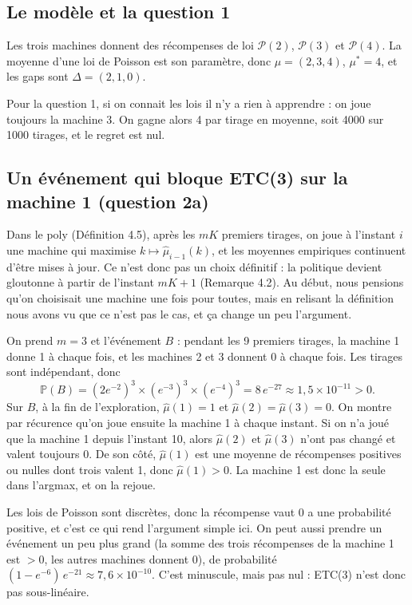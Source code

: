 \documentclass[11pt,a4paper]{article}
\begin{document}
\subsection{Le modèle et la question 1}

Les trois machines donnent des récompenses de loi $\mathcal P(2)$, $\mathcal P(3)$ et $\mathcal P(4)$. La moyenne d'une loi de Poisson est son paramètre, donc $\mu = (2, 3, 4)$, $\mu^* = 4$, et les gaps sont $\Delta = (2, 1, 0)$.

Pour la question 1, si on connait les lois il n'y a rien à apprendre : on joue toujours la machine 3. On gagne alors 4 par tirage en moyenne, soit 4000 sur 1000 tirages, et le regret est nul.

\subsection{Un événement qui bloque ETC(3) sur la machine 1 (question 2a)}

Dans le poly (Définition 4.5), après les $mK$ premiers tirages, on joue à l'instant $i$ une machine qui maximise $k \mapsto \hat\mu_{i-1}(k)$, et les moyennes empiriques continuent d'être mises à jour. Ce n'est donc pas un choix définitif : la politique devient gloutonne à partir de l'instant $mK+1$ (Remarque 4.2). Au début, nous pensions qu'on choisisait une machine une fois pour toutes, mais en relisant la définition nous avons vu que ce n'est pas le cas, et ça change un peu l'argument.

On prend $m = 3$ et l'événement $B$ : pendant les 9 premiers tirages, la machine 1 donne 1 à chaque fois, et les machines 2 et 3 donnent 0 à chaque fois. Les tirages sont indépendant, donc
\[
  \mathbb P(B) = (2e^{-2})^3 \times (e^{-3})^3 \times (e^{-4})^3 = 8\,e^{-27} \approx 1,5 \times 10^{-11} > 0.
\]
Sur $B$, à la fin de l'exploration, $\hat\mu(1) = 1$ et $\hat\mu(2) = \hat\mu(3) = 0$. On montre par récurence qu'on joue ensuite la machine 1 à chaque instant. Si on n'a joué que la machine 1 depuis l'instant 10, alors $\hat\mu(2)$ et $\hat\mu(3)$ n'ont pas changé et valent toujours 0. De son côté, $\hat\mu(1)$ est une moyenne de récompenses positives ou nulles dont trois valent 1, donc $\hat\mu(1) > 0$. La machine 1 est donc la seule dans l'argmax, et on la rejoue.

Les lois de Poisson sont discrètes, donc \og la récompense vaut 0\fg{} a une probabilité positive, et c'est ce qui rend l'argument simple ici. On peut aussi prendre un événement un peu plus grand (la somme des trois récompenses de la machine 1 est $> 0$, les autres machines donnent 0), de probabilité $(1 - e^{-6})\,e^{-21} \approx 7,6 \times 10^{-10}$. C'est minuscule, mais pas nul : ETC(3) n'est donc pas sous-linéaire.
\end{document}
